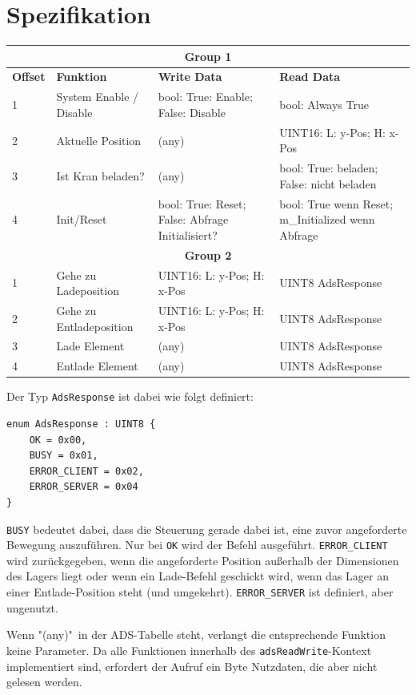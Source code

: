 \documentclass{fh-ium-bama}
\begin{document}
\section{Spezifikation}
\begin{center}
\begin{tabular}{ l p{3.1cm} p{4.4cm} p{4.5cm} }
\hline
\multicolumn{4}{c}{\textbf{Group 1}} \\ \hline
\textbf{Offset} & \textbf{Funktion} & \textbf{Write Data} & \textbf{Read Data} \\ \hline
1 & System Enable / Disable & bool: True: Enable; False: Disable & bool: Always True \\ \hline
2 & Aktuelle Position & (any) & UINT16: L: y-Pos; H: x-Pos \\ \hline
3 & Ist Kran beladen? & (any) & bool: True: beladen; False: nicht beladen \\ \hline
4 & Init/Reset & bool: True: Reset; False: Abfrage Initialisiert? & bool: True wenn Reset; m\_Initialized wenn Abfrage \\ \hline \hline
\multicolumn{4}{c}{\textbf{Group 2}} \\ \hline
1 & Gehe zu Ladeposition & UINT16: L: y-Pos; H: x-Pos & UINT8 AdsResponse \\ \hline
2 & Gehe zu Entladeposition & UINT16: L: y-Pos; H: x-Pos & UINT8 AdsResponse \\ \hline
3 & Lade Element & (any) & UINT8 AdsResponse \\ \hline
4 & Entlade Element & (any) & UINT8 AdsResponse \\ \hline
\end{tabular}
\end{center}
Der Typ \lstinline|AdsResponse| ist dabei wie folgt definiert:
\begin{lstlisting}
enum AdsResponse : UINT8 {
	OK = 0x00,
	BUSY = 0x01,
	ERROR_CLIENT = 0x02,
	ERROR_SERVER = 0x04
} 
\end{lstlisting}
\lstinline|BUSY| bedeutet dabei, dass die Steuerung gerade dabei ist, eine zuvor angeforderte Bewegung auszuführen. Nur bei \lstinline|OK| wird der Befehl ausgeführt. \lstinline|ERROR_CLIENT| wird zurückgegeben, wenn die angeforderte Position außerhalb der Dimensionen des Lagers liegt oder wenn ein Lade-Befehl geschickt wird, wenn das Lager an einer Entlade-Position steht (und umgekehrt). \lstinline|ERROR_SERVER| ist definiert, aber ungenutzt.

Wenn "(any)"\ in der ADS-Tabelle steht, verlangt die entsprechende Funktion keine Parameter. Da alle Funktionen innerhalb des \lstinline|adsReadWrite|-Kontext implementiert sind, erfordert der Aufruf ein Byte Nutzdaten, die aber nicht gelesen werden.
\end{document}
